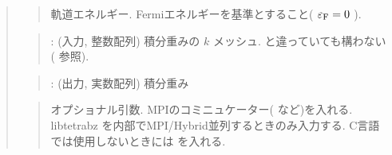 \documentclass[letterpaper,10pt,dvipdfmx,openany]{sphinxmanual}
\begin{document}
\begin{quote}
\begin{sphinxVerbatim}[commandchars=\\\{\}]
\end{sphinxVerbatim}
\begin{quote}

\sphinxAtStartPar
軌道エネルギー.
Fermiエネルギーを基準とすること( \(\varepsilon_{\rm F} = 0\) ).
\end{quote}

\begin{sphinxVerbatim}[commandchars=\\\{\}]
\end{sphinxVerbatim}
\begin{quote}

\sphinxAtStartPar
{} : (入力, 整数配列) 積分重みの \(k\) メッシュ.
 と違っていても構わない({\hyperref[\detokenize{app:app}]{}} 参照).
\end{quote}

\begin{sphinxVerbatim}[commandchars=\\\{\}]
\end{sphinxVerbatim}
\begin{quote}

\sphinxAtStartPar
{} : (出力, 実数配列) 積分重み
\end{quote}

\begin{sphinxVerbatim}[commandchars=\\\{\}]
\end{sphinxVerbatim}
\begin{quote}

\sphinxAtStartPar
オプショナル引数.
MPIのコミニュケーター(  など)を入れる.
libtetrabz を内部でMPI/Hybrid並列するときのみ入力する.
C言語では使用しないときには  を入れる.
\end{quote}
\end{quote}
\end{document}
